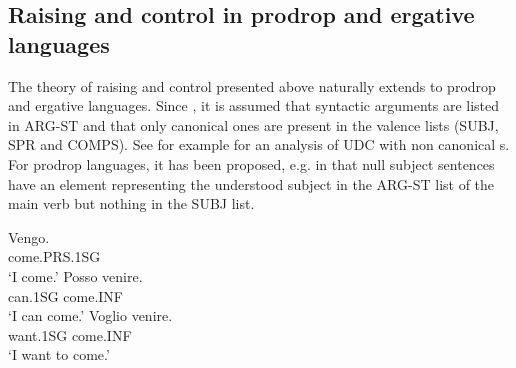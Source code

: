 \documentclass[output=paper
	        ,collection
	        ,collectionchapter
 	        ,biblatex
                ,babelshorthands
                ,newtxmath
                ,draftmode
                ,colorlinks, citecolor=brown
]{langscibook}
\begin{document}



\subsection{Raising and control in prodrop and ergative languages}
The theory of raising and control presented above naturally extends to prodrop and ergative languages. 
Since \citet{BMS2001a}, it is assumed that syntactic arguments are listed in ARG-ST and that only
canonical ones are present in the valence lists (SUBJ, SPR and COMPS). See for example
 for an analysis of UDC with non canonical s. For prodrop
languages, it has been proposed, e.g. in \citep[]{ManningandSag1998} that null subject sentences have an element representing the understood subject in the ARG-ST list of the main verb but nothing in the SUBJ list. 

\eal
\ex 
 \label{Italian}
\gll Vengo.\\
     come.PRS.1SG\\
\glt `I come.'
\ex 
\label{Italian-raising}
\gll Posso venire.\\
     can.1SG come.INF\\
\glt `I can come.'
\ex 
\label{Italian-control}
\gll Voglio venire.\\ 
     want.1SG come.INF\\
\glt `I want to come.'
\zl
\end{document}
